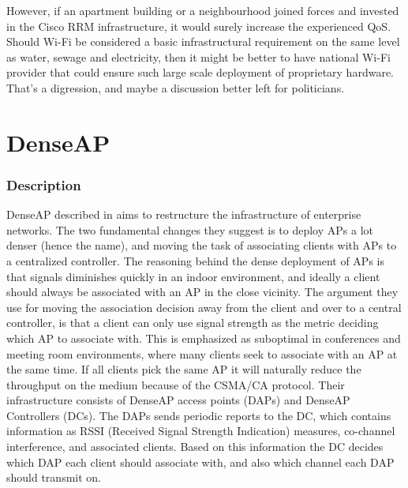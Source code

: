 However, if an apartment building or a neighbourhood joined forces and invested in the Cisco RRM infrastructure, it would surely increase the experienced QoS. Should Wi-Fi be considered
a basic infrastructural requirement on the same level as water, sewage and electricity, then it might be better to have national Wi-Fi provider
that could ensure such large scale deployment of proprietary hardware. That's a digression, and maybe a discussion better left for politicians.



\section{DenseAP}
\subsubsection{Description}
DenseAP described in \cite{Murty2} aims to restructure the infrastructure of enterprise networks.  The two fundamental
changes they suggest is to deploy APs a lot denser (hence the name), and moving the task of associating clients
with APs to a centralized controller. The reasoning behind the dense deployment of APs is that signals diminishes
quickly in an indoor environment, and ideally a client should always be associated with an AP in the close vicinity. The argument 
they use for moving the association decision away from the client and over to a central controller, is that a client can
only use signal strength as the metric deciding which AP to associate with. This is emphasized as
suboptimal in conferences and meeting room environments, where many clients seek to associate with an AP at the same time.
If all clients pick the same AP it will naturally reduce the throughput on the medium because of the CSMA/CA protocol. 
Their infrastructure consists of DenseAP access points (DAPs) and DenseAP Controllers (DCs). The DAPs sends periodic
reports to the DC, which contains information as RSSI (Received Signal Strength Indication) measures, co-channel interference, and associated clients. Based on this
information the DC decides which DAP each client should associate with, and also which channel each DAP should transmit
on. 


